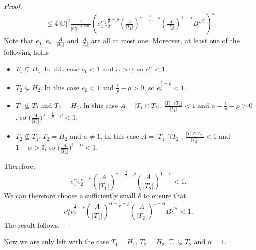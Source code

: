 \documentclass[12pt]{amsart}
\theoremstyle{definition}
\newcommand{\abs}[1]{\vert#1\vert}
\newcommand{\ceil}[1]{\lceil#1\rceil}
\begin{document}
\begin{proof}
\begin{align*}
&\leq 4\abs{G}^2
\frac{1}{\abs{G}^{n+\ceil{\alpha n}}}
\left(
e_1^{\alpha} e_2^{\frac{1}{p}-\rho}
\left(\frac{A}{\abs{T_1}}\right)^{\alpha-\frac{1}{p}-\rho}
\left(\frac{A}{\abs{T_2}}\right)^{1-\alpha}
B^{\sqrt{\delta}}
\right)^n.
\end{align*}
Note that $e_1$, $e_2$, $\frac{A}{\abs{T_1}}$ and $\frac{A}{\abs{T_2}}$ are all at most one. Moreover, at least one of the following holds
\begin{itemize}
    \item $T_1\subsetneq H_1$.
    In this case $e_1<1$ and $\alpha>0$, so $e_1^\alpha<1$.
    \item $T_2\subsetneq H_2$.
    In this case $e_2<1$ and $\frac{1}{p}-\rho>0$, so $e_2^{\frac{1}{p}-\rho}<1$.
    \item $T_1\not\subseteq T_2$ and $T_2=H_2$.
    In this case $A=\abs{T_1\cap T_2}$,
    $\frac{\abs{T_1\cap T_2}}{\abs{T_1}}<1$ and $\alpha-\frac{1}{p}-\rho>0$, so $\Big(\frac{A}{\abs{T_1}}\Big)^{\alpha-\frac{1}{p}-\rho}<1$.
    \item $T_2\not\subseteq T_1$, $T_2=H_2$ and $\alpha\neq 1$.
    In this case $A=\abs{T_1\cap T_2}$, $\frac{\abs{T_1\cap T_2}}{\abs{T_2}}<1$ and $1-\alpha>0$, so $\Big(\frac{A}{\abs{T_2}}\Big)^{1-\alpha}<1$.
\end{itemize}
Therefore,
\[
e_1^{\alpha} e_2^{\frac{1}{p}-\rho}
\left(\frac{A}{\abs{T_1}}\right)^{\alpha-\frac{1}{p}-\rho}
\left(\frac{A}{\abs{T_2}}\right)^{1-\alpha}<1.
\]
We can therefore choose a sufficiently small $\delta$ to ensure that
\[
e_1^{\alpha} e_2^{\frac{1}{p}-\rho}
\left(\frac{A}{\abs{T_1}}\right)^{\alpha-\frac{1}{p}-\rho}
\left(\frac{A}{\abs{T_2}}\right)^{1-\alpha}
B^{\sqrt{\delta}}
<1.
\]
The result follows.
\end{proof}

Now we are only left with the case $T_1=H_1$, $T_2=H_2$, $T_1\subsetneq T_2$ and $\alpha=1$.
\end{document}
